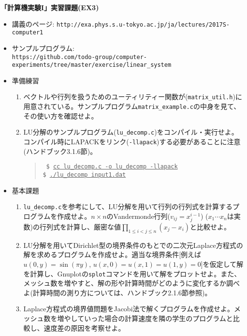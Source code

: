 \documentclass[11pt]{jarticle}
\begin{document}
\noindent
{\bf\large 「計算機実験I」実習課題(EX3)}
\\[-0.5em]

\noindent
\begin{itemize}
\item 講義のページ: \verb+http://exa.phys.s.u-tokyo.ac.jp/ja/lectures/2017S-computer1+

\item サンプルプログラム: \\ {\small \verb+https://github.com/todo-group/computer-experiments/tree/master/exercise/linear_system+}
  
\item 準備練習
  \begin{enumerate}
  \item ベクトルや行列を扱うためのユーティリティー関数が({\tt matrix\_util.h})に用意されている。サンプルプログラム{\tt matrix\_example.c}の中身を見て、その使い方を確認せよ。
  \item LU分解のサンプルプログラム({\tt lu\_decomp.c})をコンパイル・実行せよ。コンパイル時にLAPACKをリンク({\tt -llapack})する必要があることに注意(ハンドブック3.1.6節)。
    \begin{quote} \tt
      \$ \underline{cc lu\_decomp.c -o lu\_decomp -llapack} \\
      \$ \underline{./lu\_decomp input1.dat}
    \end{quote}
  \end{enumerate}

\item 基本課題
  \begin{enumerate}
  \item {\tt lu\_decomp.c}を参考にして、LU分解を用いて行列の行列式を計算するプログラムを作成せよ。$n \times n$のVandermonde行列($v_{ij}=x_j^{i-1}$) ($x_1 \cdots x_n$は実数)の行列式を計算し、厳密な値$\displaystyle \prod_{1 \le i < j \le n} (x_j-x_i)$と比較せよ。
  \item LU分解を用いてDirichlet型の境界条件のもとでの二次元Laplace方程式の解を求めるプログラムを作成せよ。適当な境界条件[例えば$u(0,y) = \sin(\pi y)$, $u(x,0)=u(x,1)=u(1,y)=0$]を仮定して解を計算し、Gnuplotの{\tt splot}コマンドを用いて解をプロットせよ。また、メッシュ数を増やすと、解の形や計算時間がどのように変化するか調べよ(計算時間の測り方については、ハンドブック2.1.6節参照)。
  \item Laplace方程式の境界値問題をJacobi法で解くプログラムを作成せよ。メッシュ数を増やしていった場合の計算速度を隣の学生のプログラムと比較し、速度差の原因を考察せよ。
  \end{enumerate}
  

\end{itemize}
\end{document}
